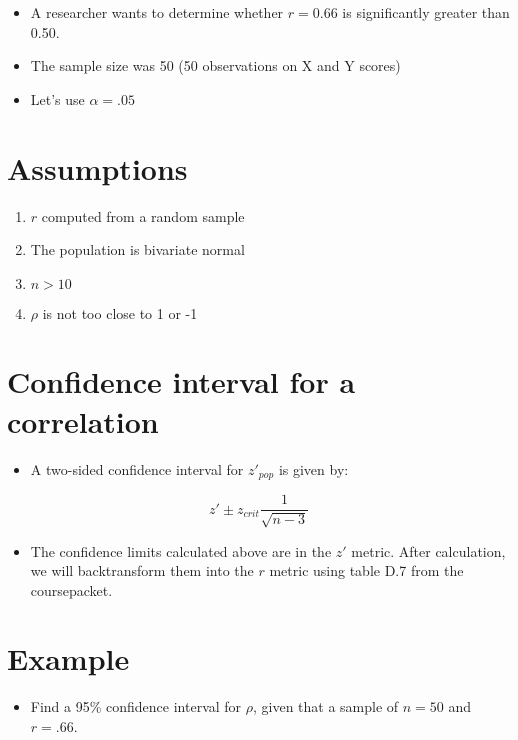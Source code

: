 \documentclass[12pt]{article}
\begin{document}
\begin{itemize}
\itemsep1pt\parskip0pt
\item
  A researcher wants to determine whether \(r = 0.66\) is significantly
  greater than 0.50.
\item
  The sample size was 50 (50 observations on X and Y scores)
\item
  Let's use \(\alpha = .05\)
\end{itemize}

\section{Assumptions}\label{assumptions}

\begin{enumerate}
\def\labelenumi{\arabic{enumi}.}
\itemsep1pt\parskip0pt
\item
  \(r\) computed from a random sample
\item
  The population is bivariate normal
\item
  \(n > 10\)
\item
  \(\rho\) is not too close to 1 or -1
\end{enumerate}

\section{Confidence interval for a
correlation}\label{confidence-interval-for-a-correlation}

\begin{itemize}
\itemsep1pt\parskip0pt
\item
  A two-sided confidence interval for \(z'_{pop}\) is given by:
\end{itemize}

\[ z' \pm z_{crit} \frac{1}{\sqrt{n - 3}} \]

\begin{itemize}
\itemsep1pt\parskip0pt
\item
  The confidence limits calculated above are in the \(z'\) metric. After
  calculation, we will backtransform them into the \(r\) metric using
  table D.7 from the coursepacket.
\end{itemize}

\section{Example}\label{example-2}

\begin{itemize}
\itemsep1pt\parskip0pt
\item
  Find a 95\% confidence interval for \(\rho\), given that a sample of
  \(n = 50\) and \(r = .66\).
\end{itemize}
\end{document}
